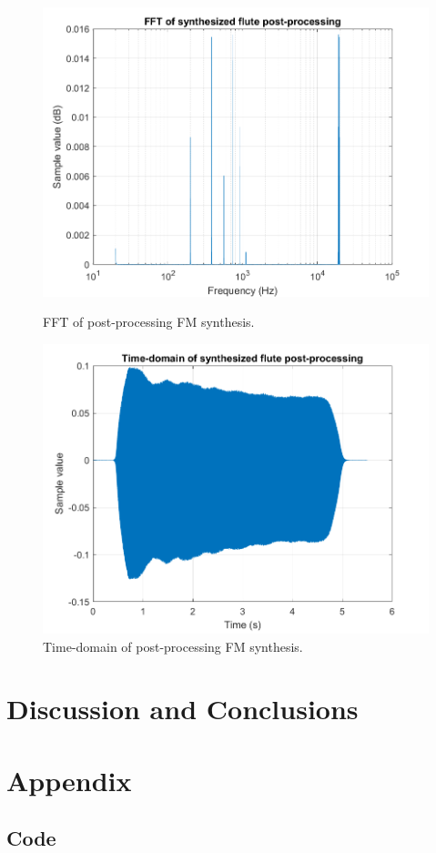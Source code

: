 \documentclass{article}
\begin{document}
            \begin{figure}[H]
                \centering
                \begin{minipage}{.49\textwidth}
                    \includegraphics[width=\linewidth]{images/synthFlutePostProcessFFT.png}%
                    \centering
                    \caption{FFT of post-processing FM synthesis.}
                    \label{synthFlutePostProcessFFT}
                \end{minipage}
                \begin{minipage}{.49\textwidth}
                    \includegraphics[width=\linewidth]{images/synthFlutePostProcess.png}%
                    \centering
                    \caption{Time-domain of post-processing FM synthesis.}
                    \label{synthFlutePostProcess}
                \end{minipage}
            \end{figure}

\section{Discussion and Conclusions}
\section{Appendix}
\subsection{Code}





\end{document}
